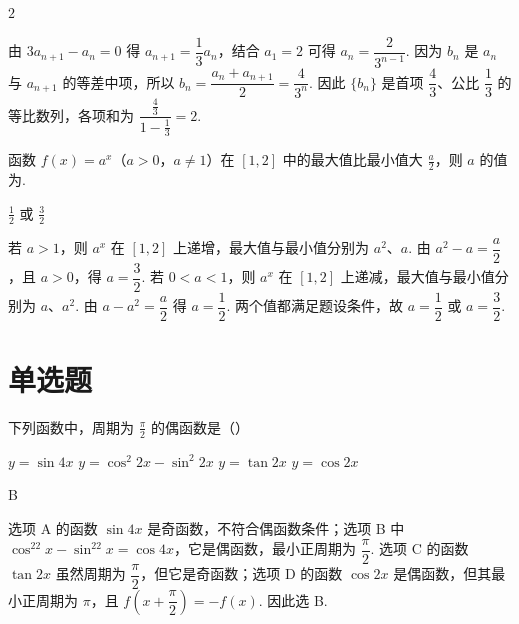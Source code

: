 \begin{answer}
\(2\)
\end{answer}

\begin{solution}
由 \(3a_{n+1}-a_n=0\) 得 \(a_{n+1}=\dfrac13a_n\)，结合 \(a_1=2\) 可得 \(a_n=\dfrac{2}{3^{n-1}}\). 因为 \(b_n\) 是 \(a_n\) 与 \(a_{n+1}\) 的等差中项，所以 \(b_n=\dfrac{a_n+a_{n+1}}2=\dfrac{4}{3^n}\). 因此 \(\{b_n\}\) 是首项 \(\dfrac43\)、公比 \(\dfrac13\) 的等比数列，各项和为 \(\dfrac{\frac43}{1-\frac13}=2\).
\end{solution}

\begin{problem}
函数 \(f(x)=a^{x}\)（\(a>0\)，\(a\neq1\)）在 \([1,2] \) 中的最大值比最小值大 \(\frac{a}{2} \)，则 \(a\) 的值为\fillinblank{}.
\end{problem}

\begin{answer}
\(\frac{1}{2}\) 或 \(\frac{3}{2}\)
\end{answer}

\begin{solution}
若 \(a>1\)，则 \(a^x\) 在 \([1,2]\) 上递增，最大值与最小值分别为 \(a^2\)、\(a\). 由 \(a^2-a=\dfrac a2\)，且 \(a>0\)，得 \(a=\dfrac32\). 若 \(0<a<1\)，则 \(a^x\) 在 \([1,2]\) 上递减，最大值与最小值分别为 \(a\)、\(a^2\). 由 \(a-a^2=\dfrac a2\) 得 \(a=\dfrac12\). 两个值都满足题设条件，故 \(a=\dfrac12\) 或 \(a=\dfrac32\).
\end{solution}

\section{单选题}

\begin{problem}
下列函数中，周期为 \(\frac{\pi}{2}\) 的偶函数是（\quad）

\choices
    {\(y = \sin 4x \)}
    {\(y = \cos^{2}2x - \sin^{2}2x \)}
    {\(y = \tan 2x \)}
    {\(y = \cos 2x \)}
\end{problem}

\begin{answer}
B
\end{answer}

\begin{solution}
选项 A 的函数 \(\sin4x\) 是奇函数，不符合偶函数条件；选项 B 中 \(\cos^22x-\sin^22x=\cos4x\)，它是偶函数，最小正周期为 \(\dfrac\pi2\). 选项 C 的函数 \(\tan2x\) 虽然周期为 \(\dfrac\pi2\)，但它是奇函数；选项 D 的函数 \(\cos2x\) 是偶函数，但其最小正周期为 \(\pi\)，且 \(f\left(x+\dfrac\pi2\right)=-f(x)\). 因此选 B.
\end{solution}

